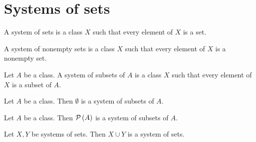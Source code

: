 \documentclass[../../set-theory/set-theory.tex]{subfiles}
\begin{document}
  \section{Systems of sets}

  \begin{forthel}
    \begin{definition}
      A system of sets is a class $X$ such that every element of $X$ is a set.
    \end{definition}
  \end{forthel}

  \begin{forthel}
    \begin{definition}
      A system of nonempty sets is a class $X$ such that every element of $X$ is
      a nonempty set.
    \end{definition}
  \end{forthel}

  \begin{forthel}
    \begin{definition}
      Let $A$ be a class.
      A system of subsets of $A$ is a class $X$ such that every element of $X$
      is a subset of $A$.
    \end{definition}
  \end{forthel}

  \begin{forthel}
    \begin{proposition}
      Let $A$ be a class.
      Then $\emptyset$ is a system of subsets of $A$.
    \end{proposition}
  \end{forthel}

  \begin{forthel}
    \begin{proposition}
      Let $A$ be a class.
      Then $\mathcal{P}\left(A\right)$ is a system of subsets of $A$.
    \end{proposition}
  \end{forthel}

  \begin{forthel}
    \begin{proposition}
      Let $X, Y$ be systems of sets.
      Then $X \cup Y$ is a system of sets.
    \end{proposition}
  \end{forthel}
\end{document}
